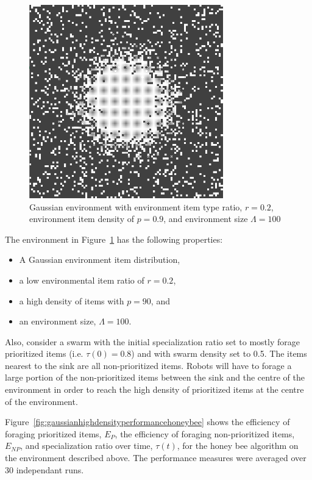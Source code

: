 \begin{figure}[htbp!]
    \centering
    \includegraphics[width=0.75\textwidth]{chapters/chapter6/figures/flexibility-gaussian-obj90-ratio.PNG}
    \caption{Gaussian environment with environment item type ratio, $r=0.2$, environment item density of $p=0.9$, and environment size $\Lambda=100$}
    \label{fig:gaussianhighdensityenv}
\end{figure}
    

The environment in Figure~\ref{fig:gaussianhighdensityenv} has the following properties:

\begin{itemize}
\item A Gaussian environment item distribution,
\item a low environmental item ratio of $r=0.2$,
\item a high density of items with $p=90$, and
\item an environment size, $\Lambda=100$.
\end{itemize}


Also, consider a swarm with the initial specialization ratio set to mostly forage prioritized items (i.e. $\tau(0)=0.8$) and with swarm density set to 0.5. The items nearest to the sink are all non-prioritized items. Robots will have to forage a large portion of the non-prioritized items between the sink and the centre of the environment in order to reach the high density of prioritized items at the centre of the environment. 


Figure~\ref{fig:gaussianhighdensityperformancehoneybee} shows the efficiency of foraging prioritized items, $E_P$, the efficiency of foraging non-prioritized items, $E_{NP}$, and specialization ratio over time, $\tau(t)$, for the honey bee algorithm on the environment described above. The performance measures were averaged over 30 independant runs.



